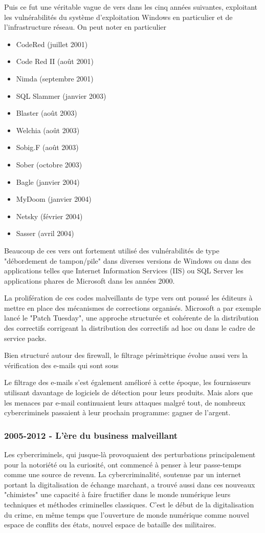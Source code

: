Puis ce fut une véritable vague de vers dans les cinq années suivantes, exploitant les vulnérabilités du système d'exploitation Windows en particulier et  de l'infrastructure réseau. On peut noter en particulier

\begin{itemize}
  \item CodeRed (juillet 2001)
  \item Code Red II (août 2001)
  \item Nimda (septembre 2001)
  \item SQL Slammer (janvier 2003)
  \item Blaster (août 2003)
  \item Welchia (août 2003)
  \item Sobig.F (août 2003)
  \item Sober (octobre 2003)
  \item Bagle (janvier 2004)
  \item MyDoom (janvier 2004)
  \item Netsky (février 2004)
  \item Sasser (avril 2004)
\end{itemize}


Beaucoup de ces vers ont fortement utilisé des vulnérabilités de type "débordement de tampon/pile" dans diverses versions de Windows ou dans des applications telles que Internet Information Services (IIS) ou SQL Server les applications phares de Microsoft dans les années 2000.

La prolifération de ces codes malveillants de type vers ont poussé les éditeurs à mettre en place des mécanismes de corrections organisés. Microsoft a par exemple lancé le "Patch Tuesday", une approche structurée et cohérente de la distribution des correctifs corrigeant la distribution des correctifs ad hoc ou dans le cadre de service packs.

Bien structuré autour des firewall, le filtrage périmètrique évolue aussi vers la vérification des e-mails qui sont sous 

Le filtrage des e-mails s'est également amélioré à cette époque, les fournisseurs utilisant davantage de logiciels de détection pour leurs produits. Mais alors que les menaces par e-mail continuaient leurs attaques malgré tout, de nombreux cybercriminels passaient à leur prochain programme: gagner de l'argent.

\subsubsection{2005-2012 - L'ère du business malveillant}
Les cybercriminels, qui jusque-là provoquaient des perturbations principalement pour la notoriété ou la curiosité, ont commencé à penser à leur passe-temps comme une source de revenu. La cybercriminalité, soutenue par un internet portant la digitalisation de échange marchant, a trouvé aussi dans ces nouveaux "chimistes" une capacité à faire fructifier dans le monde numérique leurs techniques et méthodes criminelles classiques. C'est le début de la digitalisation du crime, en même temps que l'ouverture de monde numérique comme  nouvel espace de conflits des états, nouvel espace de bataille des militaires.

